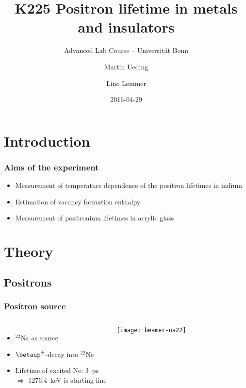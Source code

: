 \documentclass[english, fleqn]{beamer}
\title{K225 Positron lifetime in metals and insulators}
\subtitle{Advanced Lab Course -- Universität Bonn}
\author{%
    Martin Ueding
    \and
    Lino Lemmer
}
\date{2016-04-29}
\begin{document}
\begin{frame}
    \titlepage
\end{frame}

\begin{frame}
    \titlepage
\end{frame}

\section{Introduction}

\begin{frame}
    \frametitle{Aims of the experiment}
    \begin{itemize}
        \item 
            Measurement of temperature dependence of the positron lifetimes in indium
        \item
            Estimation of vacancy formation enthalpy
        \item
            Measurement of positronium lifetimes in acrylic glass
    \end{itemize}
\end{frame}

\section{Theory}

\subsection{Positrons}

\begin{frame}
    \frametitle{Positron source}
    \begin{columns}[c]
        \begin{itemize}
            \item 
                ${}^{22}\text{Na}$ as source
            \item
                $\betaup^+$-decay into ${}^{22}\text{Ne}$
            \item
                Lifetime of excited Ne: \SI{3}{\pico\second} \\
                $\Rightarrow$ \SI{1276.4}{\kilo\electronvolt} is starting line
        \end{itemize}
        \centering
        \texttt{[image: beamer-na22]}
    \end{columns}
\end{frame}
\end{document}
